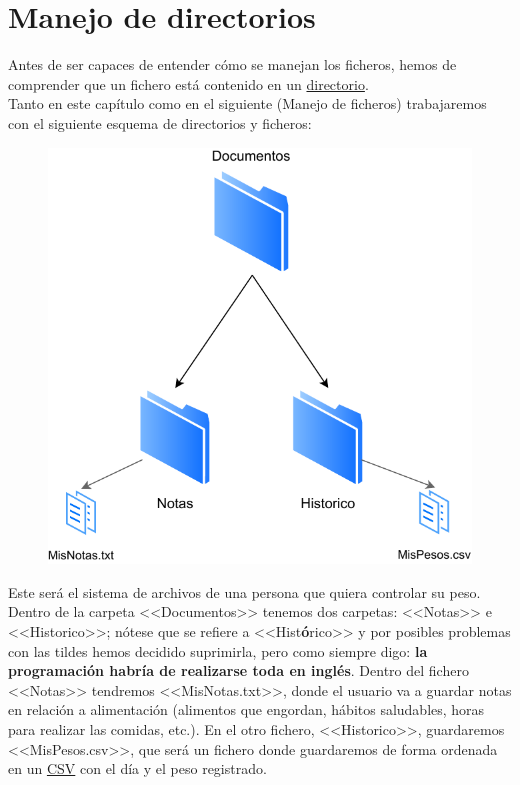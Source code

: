 \documentclass[11pt, oneside]{book}		%
\begin{document}
\chapter{Manejo de directorios}
Antes de ser capaces de entender cómo se manejan los ficheros, hemos de comprender que un fichero está contenido en un \hypertarget{directorioRet}{\hyperlink{directorioDef}{directorio}}\cite{msdn:directorio}.\\
Tanto en este capítulo como en el siguiente (Manejo de ficheros) trabajaremos con el siguiente esquema de directorios y ficheros:
\begin{figure}[H]
	\centering
	\includegraphics{img/ManejoDeFicherosYDirectorios/esquema.pdf}
\end{figure}
Este será el sistema de archivos de una persona que quiera controlar su peso. Dentro de la carpeta <<Documentos>> tenemos dos carpetas: <<Notas>> e <<Historico>>; nótese que se refiere a <<Hist\textbf{ó}rico>> y por posibles problemas con las tildes hemos decidido suprimirla, pero como siempre digo: \textbf{la programación habría de realizarse toda en inglés}. Dentro del fichero <<Notas>> tendremos <<MisNotas.txt>>, donde el usuario va a guardar notas en relación a alimentación (alimentos que engordan, hábitos saludables, horas para realizar las comidas, etc.). En el otro fichero, <<Historico>>, guardaremos <<MisPesos.csv>>, que será un fichero donde guardaremos de forma ordenada en un \hypertarget{CSVRet}{\hyperlink{CSVDef}{CSV}} con el día y el peso registrado.\\
\end{document}
